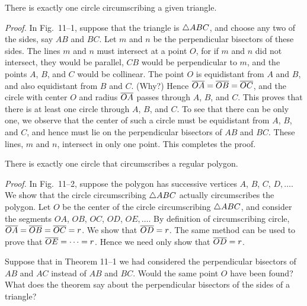 \documentclass[11pt]{book}
\theoremstyle{XIplainnote}
\theoremstyle{bkplain}
\begin{document}
\begin{theorem}
There is exactly one circle circumscribing a given triangle.
\end{theorem}

\noindent\emph{Proof.} In Fig.~11--1, suppose that the triangle is
$\triangle ABC$, and choose any two of the sides, say $AB$ and $BC$. Let $m$ and
$n$ be the perpendicular bisectors of these sides. The lines $m$ and $n$ must
intersect at a point $O$, for if $m$ and $n$ did not intersect, they would be
parallel, $CB$ would be perpendicular to $m$, and the points $A$, $B$, and $C$
would be collinear. The point $O$ is equidistant from $A$ and $B$, and also
equidistant from $B$ and $C$. (Why?) Hence $\overline{OA} = \overline{OB} = \overline{OC}$, and
the circle with center $O$ and radius $\overline{OA}$ passes through $A$, $B$, and
$C$. This proves that there is at least one circle through $A$, $B$, and $C$.
To see that there can be only one, we observe that the center of such a circle
must be equidistant from $A$, $B$, and $C$, and hence must lie on the
perpendicular bisectors of $AB$ and $BC$. These lines, $m$ and $n$, intersect
in only one point. This completes the proof.

\FIGXIONETWO

\begin{theorem}
There is exactly one circle that circumscribes a regular polygon.
\end{theorem}

\noindent\emph{Proof.} In Fig.~11--2, suppose the polygon has successive
vertices $A$, $B$, $C$, $D,\ldots$. We show that the circle circumscribing
$\triangle ABC$ actually circumscribes the polygon. Let $O$ be the center of the
circle circumscribing $\triangle ABC$, and consider the segments $OA$, $OB$, $OC$,
$OD$, $OE,\ldots$. By definition of circumscribing circle,
$\overline{OA} = \overline{OB} = \overline{OC} = r$. We show that $\overline{OD} = r$. The same method
can be used to prove that $\overline{OE} = \cdots = r$. Hence we need only show that
$\overline{OD} = r$.

\begin{steps}
\end{steps}

Suppose that in Theorem 11--1 we had considered the perpendicular bisectors of
$AB$ and $AC$ instead of $AB$ and $BC$. Would the same point $O$ have been
found? What does the theorem say about the perpendicular bisectors of the
sides of a triangle?
\end{document}
